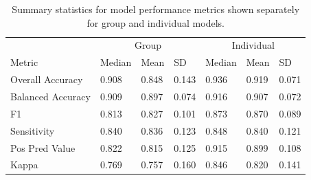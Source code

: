 \documentclass[
  man]{apa6}
\begin{document}
\begin{table}[tbp]

\begin{center}
\begin{threeparttable}

\caption{\label{tab:metricstable}Summary statistics for model performance metrics shown separately for group and individual models.}

\begin{tabular}{lllllll}
\toprule
 & \multicolumn{3}{c}{Group} & \multicolumn{3}{c}{Individual} \\
\cmidrule(r){2-4} \cmidrule(r){5-7}
Metric & Median & Mean & SD & Median & Mean & SD\\
\midrule
Overall Accuracy & 0.908 & 0.848 & 0.143 & 0.936 & 0.919 & 0.071\\
Balanced Accuracy & 0.909 & 0.897 & 0.074 & 0.916 & 0.907 & 0.072\\
F1 & 0.813 & 0.827 & 0.101 & 0.873 & 0.870 & 0.089\\
Sensitivity & 0.840 & 0.836 & 0.123 & 0.848 & 0.840 & 0.121\\
Pos Pred Value & 0.822 & 0.815 & 0.125 & 0.915 & 0.899 & 0.108\\
Kappa & 0.769 & 0.757 & 0.160 & 0.846 & 0.820 & 0.141\\
\bottomrule
\end{tabular}

\end{threeparttable}
\end{center}

\end{table}

\renewcommand{\arraystretch}{.75}
\end{document}
